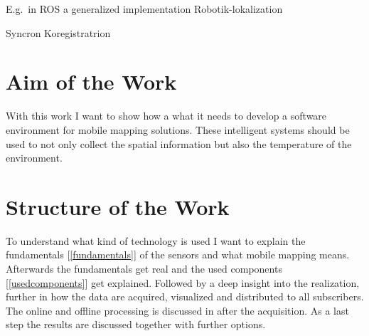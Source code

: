E.g.\ in \ac{ROS} a generalized implementation 
Robotik-lokalization\cite{MooreStouchKeneralizedEkf2014}

Syncron Koregistratrion\cite{Frank2019SyncKoreg} 

\section{Aim of the Work}\label{sec:aimOfTheWork}
With this work I want to show how a what it needs to develop a software environment for mobile mapping solutions.
These intelligent systems should be used to not only collect the spatial information but also the temperature of the environment.

\section{Structure of the Work}\label{sec:structure}

To understand what kind of technology is used I want to explain the fundamentals [\ref{fundamentals}] of the sensors and what mobile mapping means.
Afterwards the fundamentals get real and the used components [\ref{usedcomponents}] get explained.
Followed by a deep insight into the realization, further in how the data are acquired, visualized and distributed to all subscribers.
The online and offline processing is discussed in after the acquisition.
As a last step the results are discussed together with further options.
